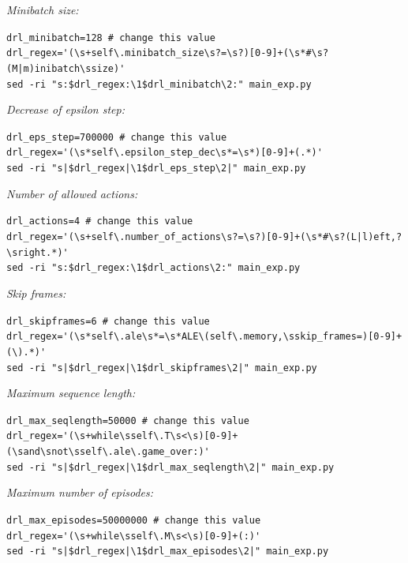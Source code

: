 \documentclass[a4paper,oneside,dvipsnames]{article}
\begin{document}
\textit{Minibatch size:}
\begin{tcolorbox}[width=\linewidth]
\verb!drl_minibatch=128 # change this value! \\
\verb!drl_regex='(\s+self\.minibatch_size\s?=\s?)[0-9]+(\s*#\s?(M|m)inibatch\ssize)'! \\
\verb!sed -ri "s:$drl_regex:\1$drl_minibatch\2:" main_exp.py!
\end{tcolorbox}

\textit{Decrease of epsilon step:}
\begin{tcolorbox}[width=\linewidth]
\verb!drl_eps_step=700000 # change this value! \\
\verb!drl_regex='(\s*self\.epsilon_step_dec\s*=\s*)[0-9]+(.*)'! \\
\verb!sed -ri "s|$drl_regex|\1$drl_eps_step\2|" main_exp.py!
\end{tcolorbox}

\textit{Number of allowed actions:}
\begin{tcolorbox}[width=\linewidth]
\verb!drl_actions=4 # change this value! \\
\verb!drl_regex='(\s+self\.number_of_actions\s?=\s?)[0-9]+(\s*#\s?(L|l)eft,?\sright.*)'! \\
\verb!sed -ri "s:$drl_regex:\1$drl_actions\2:" main_exp.py!
\end{tcolorbox}

\textit{Skip frames:}
\begin{tcolorbox}[width=\linewidth]
\verb!drl_skipframes=6 # change this value! \\
\verb!drl_regex='(\s*self\.ale\s*=\s*ALE\(self\.memory,\sskip_frames=)[0-9]+(\).*)'! \\
\verb!sed -ri "s|$drl_regex|\1$drl_skipframes\2|" main_exp.py!
\end{tcolorbox}

\textit{Maximum sequence length:}
\begin{tcolorbox}[width=\linewidth]
\verb!drl_max_seqlength=50000 # change this value! \\
\verb!drl_regex='(\s+while\sself\.T\s<\s)[0-9]+(\sand\snot\sself\.ale\.game_over:)'! \\
\verb!sed -ri "s|$drl_regex|\1$drl_max_seqlength\2|" main_exp.py!
\end{tcolorbox}

\textit{Maximum number of episodes:}
\begin{tcolorbox}[width=\linewidth]
\verb!drl_max_episodes=50000000 # change this value! \\
\verb!drl_regex='(\s+while\sself\.M\s<\s)[0-9]+(:)'! \\
\verb!sed -ri "s|$drl_regex|\1$drl_max_episodes\2|" main_exp.py!
\end{tcolorbox}
\end{document}
